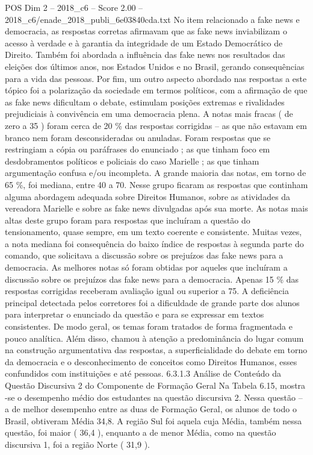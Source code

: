 \begin{textsample}{POS Dim 2 – 2018\_c6 – Score 2.00 – 2018\_c6/enade\_2018\_publi\_6e03840cda.txt}
No item relacionado a fake news e democracia, as respostas corretas afirmavam que as fake news inviabilizam o acesso à verdade e à garantia da integridade de um Estado Democrático de Direito.
Também foi abordada a influência das fake news nos resultados das eleições dos últimos anos, nos Estados Unidos e no Brasil, gerando consequências para a vida das pessoas.
Por fim, um outro aspecto abordado nas respostas a este tópico foi a polarização da sociedade em termos políticos, com a afirmação de que as fake news dificultam o debate, estimulam posições extremas e rivalidades prejudiciais à convivência em uma democracia plena.
A notas mais fracas ( de zero a 35 ) foram cerca de 20 \% das respostas corrigidas – as que não estavam em branco nem foram desconsideradas ou anuladas.
Foram respostas que se restringiam a cópia ou paráfrases do enunciado ; as que tinham foco em desdobramentos políticos e policiais do caso Marielle ; as que tinham argumentação confusa e/ou incompleta.
A grande maioria das notas, em torno de 65 \%, foi mediana, entre 40 a 70.
Nesse grupo ficaram as respostas que continham alguma abordagem adequada sobre Direitos Humanos, sobre as atividades da vereadora Marielle e sobre as fake news divulgadas após sua morte.
As notas mais altas deste grupo foram para respostas que incluíram a questão do tensionamento, quase sempre, em um texto coerente e consistente.
Muitas vezes, a nota mediana foi consequência do baixo índice de respostas à segunda parte do comando, que solicitava a discussão sobre os prejuízos das fake news para a democracia.
As melhores notas só foram obtidas por aqueles que incluíram a discussão sobre os prejuízos das fake news para a democracia.
Apenas 15 \% das respostas corrigidas receberam avaliação igual ou superior a 75.
A deficiência principal detectada pelos corretores foi a dificuldade de grande parte dos alunos para interpretar o enunciado da questão e para se expressar em textos consistentes.
De modo geral, os temas foram tratados de forma fragmentada e pouco analítica.
Além disso, chamou à atenção a predominância do lugar comum na construção argumentativa das respostas, a superficialidade do debate em torno da democracia e o desconhecimento de conceitos como Direitos Humanos, esses confundidos com instituições e até pessoas. 6.3.1.3 Análise de Conteúdo da Questão Discursiva 2 do Componente de Formação Geral Na Tabela 6.15, mostra -se o desempenho médio dos estudantes na questão discursiva 2.
Nessa questão – a de melhor desempenho entre as duas de Formação Geral, os alunos de todo o Brasil, obtiveram Média 34,8.
A região Sul foi aquela cuja Média, também nessa questão, foi maior ( 36,4 ), enquanto a de menor Média, como na questão discursiva 1, foi a região Norte ( 31,9 ).

\end{textsample}
